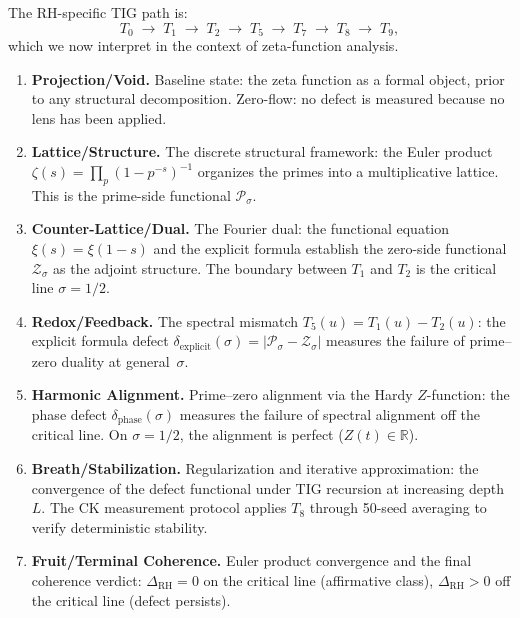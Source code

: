 \documentclass[11pt]{article}
\theoremstyle{remark}
\begin{document}
The RH-specific TIG path is:
\begin{equation}\label{eq:tig-path}
  T_0 \;\to\; T_1 \;\to\; T_2 \;\to\; T_5 \;\to\; T_7 \;\to\; T_8 \;\to\; T_9,
\end{equation}
which we now interpret in the context of zeta-function analysis.

\begin{enumerate}
  \item[\textbf{$T_0$}] \textbf{Projection/Void.}
    Baseline state: the zeta function as a formal object, prior to any structural
    decomposition.
    Zero-flow: no defect is measured because no lens has been applied.

  \item[\textbf{$T_1$}] \textbf{Lattice/Structure.}
    The discrete structural framework: the Euler product
    $\zeta(s)=\prod_p(1-p^{-s})^{-1}$ organizes the primes into a multiplicative
    lattice.
    This is the prime-side functional $\mathcal{P}_\sigma$.

  \item[\textbf{$T_2$}] \textbf{Counter-Lattice/Dual.}
    The Fourier dual: the functional equation $\xi(s)=\xi(1-s)$ and the explicit
    formula establish the zero-side functional $\mathcal{Z}_\sigma$ as the adjoint
    structure.
    The boundary between $T_1$ and $T_2$ is the critical line $\sigma=1/2$.

  \item[\textbf{$T_5$}] \textbf{Redox/Feedback.}
    The spectral mismatch $T_5(u)=T_1(u)-T_2(u)$: the explicit formula defect
    $\delta_{\mathrm{explicit}}(\sigma)=|\mathcal{P}_\sigma-\mathcal{Z}_\sigma|$
    measures the failure of prime--zero duality at general~$\sigma$.

  \item[\textbf{$T_7$}] \textbf{Harmonic Alignment.}
    Prime--zero alignment via the Hardy $Z$-function: the phase defect
    $\delta_{\mathrm{phase}}(\sigma)$ measures the failure of spectral alignment off the
    critical line.
    On $\sigma=1/2$, the alignment is perfect ($Z(t)\in\mathbb{R}$).

  \item[\textbf{$T_8$}] \textbf{Breath/Stabilization.}
    Regularization and iterative approximation: the convergence of the defect functional
    under TIG recursion at increasing depth~$L$.
    The CK measurement protocol applies $T_8$ through 50-seed averaging to verify
    deterministic stability.

  \item[\textbf{$T_9$}] \textbf{Fruit/Terminal Coherence.}
    Euler product convergence and the final coherence verdict: $\Delta_{\mathrm{RH}}=0$
    on the critical line (affirmative class), $\Delta_{\mathrm{RH}}>0$ off the critical
    line (defect persists).
\end{enumerate}
\end{document}
